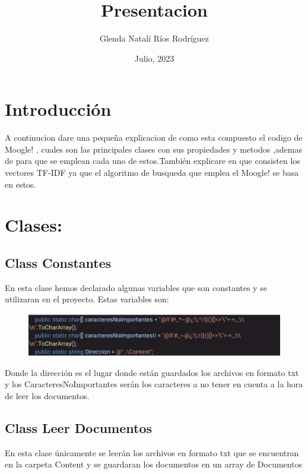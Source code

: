 \documentclass[a4paper,12pt]{article}
\begin{document}
\title{Presentacion}
\author{Glenda Natalí Ríos Rodríguez}
\date{Julio, 2023}
\maketitle


\section{Introducción}\label{sec:intro}

 A continucion dare una pequeña explicacion de como esta compuesto el codigo de Moogle! , cuales son las principales clases
 con sus propiedades y metodos ,ademas de para que se emplean cada uno de estos.También explicare en que consisten los vectores
 TF-IDF ya que el algoritmo de busqueda que emplea el Moogle! se basa en estos. 

\section{Clases:}\label{sec:cls}


\subsection{Class Constantes}\label{sub:Constantes}

En esta clase hemos declarado algunas variables que son constantes y se utilizaran en el proyecto. Estas variables son:

\begin{figure}[H]
    \centering
    \includegraphics[width=\textwidth]{imagenes/1.jpg}
\end{figure}

Donde la dirección es el lugar donde están guardados los archivos en formato txt y los CaracteresNoImportantes serán los caracteres
a no tener en cuenta a la hora de leer los documentos.

\subsection{Class Leer Documentos}\label{sub:Leer Documentos}

En esta clase únicamente se leerán los archivos en formato txt que se encuentran en la carpeta Content y se guardaran los documentos
en un array de Documentos
\end{document}
